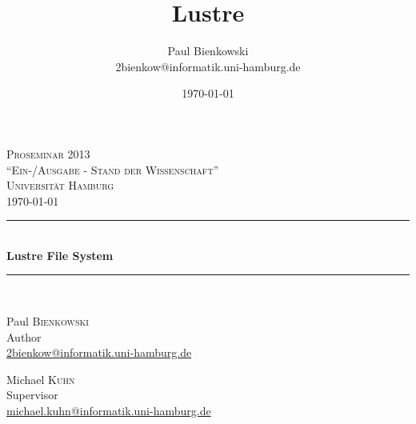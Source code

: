\documentclass[a4paper,11pt,fleqn,oneside]{scrartcl}
\title{Lustre}
\author{Paul Bienkowski \\[0.2em] \scriptsize 2bienkow@informatik.uni-hamburg.de}
\date{\today}
\begin{document}

\begin{titlepage}
    \begin{center}
    \vspace*{\fill}

    \textsc{\Large Proseminar 2013}\\[0.0cm]
    \textsc{\small ``Ein-/Ausgabe - Stand der Wissenschaft''}\\[0.0cm]
    \textsc{\small Universität Hamburg}
    \\[0.5cm]
    \textsc{\today}\\[0.5cm]

    \rule{0.8\textwidth}{0.4pt}
    \\[0.4cm]
    {\huge \bfseries Lustre File System}
    \\[0.0cm]
    \rule{0.8\textwidth}{0.4pt}\\[1.2cm]

    \begin{minipage}{0.4\textwidth}
        \begin{flushleft} \large
            Paul \textsc{Bienkowski}\\
            {\small Author}\\
            {\scriptsize \url{2bienkow@informatik.uni-hamburg.de}}
        \end{flushleft}
    \end{minipage}
    \begin{minipage}{0.4\textwidth}
        \begin{flushright} \large
            Michael \textsc{Kuhn}\\
            {\small Supervisor}\\
            {\scriptsize \url{michael.kuhn@informatik.uni-hamburg.de}}
        \end{flushright}
    \end{minipage}

    \vfill

    \end{center}
\end{titlepage}









\end{document}
